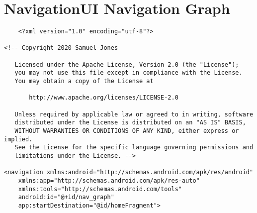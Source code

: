 \section{NavigationUI Navigation Graph} \label{NAVIGATIONGRAPH}
\begin{verbatim}
    <?xml version="1.0" encoding="utf-8"?>

<!-- Copyright 2020 Samuel Jones

   Licensed under the Apache License, Version 2.0 (the "License");
   you may not use this file except in compliance with the License.
   You may obtain a copy of the License at

       http://www.apache.org/licenses/LICENSE-2.0

   Unless required by applicable law or agreed to in writing, software
   distributed under the License is distributed on an "AS IS" BASIS,
   WITHOUT WARRANTIES OR CONDITIONS OF ANY KIND, either express or implied.
   See the License for the specific language governing permissions and
   limitations under the License. -->

<navigation xmlns:android="http://schemas.android.com/apk/res/android"
    xmlns:app="http://schemas.android.com/apk/res-auto"
    xmlns:tools="http://schemas.android.com/tools"
    android:id="@+id/nav_graph"
    app:startDestination="@id/homeFragment">


\end{verbatim}
